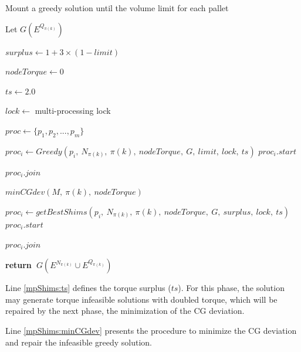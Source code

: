 \documentclass[preprint,authoryear]{elsarticle}
\renewcommand{\Return}{\State \bf {return}~}
\begin{document}
\begin{algorithm}[H]
	\caption{Mount a greedy solution until the volume limit for each pallet}  \label{alg:mpShims}
	
	\begin{algorithmic}[1]
		
		
		\State Let $G(E^{Q_{\pi(k)}})$ 
		
		\State $surplus \gets 1 + 3 \times (1 - limit)$
		
		\State $nodeTorque \gets 0$
		
		\State $ts \gets 2.0$  \label{mpShims:ts}
		
		\State $lock \gets$ multi-processing lock 
		
		\State $proc \gets \{p_1,p_2,..., p_m\}$  
		
		\State $proc_i \gets Greedy(p_i,\ N_{\pi(k)},\ \pi(k),\ nodeTorque,\ G,\ limit,\ lock,\ ts )$
		\State $proc_i.start$
		\EndFor
		
		\State $proc_i.join$
		\EndFor
		
		\State $minCGdev(M,\ \pi(k),\ nodeTorque)$  \label{mpShims:minCGdev} 
		
		\State $proc_i \gets getBestShims(p_i,\ N_{\pi(k)},\ \pi(k),\ nodeTorque,\ G,\ surplus,\ lock,\ ts )$
		\State $proc_i.start$
		\EndFor
		
		\State $proc_i.join$

		\EndFor
		
		\Return $G(E^{N_{\pi(k)}} \cup E^{Q_{\pi(k)}})$
		
		\EndProcedure
		
	\end{algorithmic}
\end{algorithm}

Line \ref{mpShims:ts} defines the torque surplus ($ts$). For this phase, the solution may generate torque infeasible solutions with doubled torque, which will be repaired by the next phase, the minimization of the CG deviation.

Line \ref{mpShims:minCGdev} presents the procedure to minimize the CG deviation and repair the infeasible greedy solution.
\end{document}
